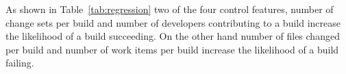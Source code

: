 As shown in Table~\ref{tab:regression} two of the four control features, number of change sets per build and number of developers contributing to a build increase the likelihood of a build succeeding.
On the other hand number of files changed per build and number of work items per build increase the likelihood of a build failing.





